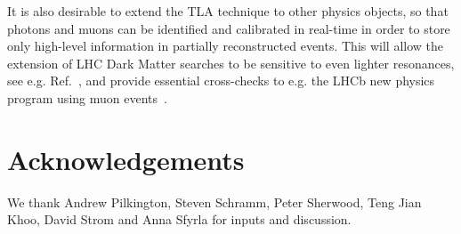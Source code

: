 \documentclass[a4paper,justified]{tufte-handout}
\begin{document}
 It is also desirable to extend the TLA technique to other physics objects, so that photons and muons can be identified and calibrated in real-time in order to store only high-level information in partially reconstructed events. This will allow the extension of LHC Dark Matter searches to be sensitive to even lighter resonances, see e.g. Ref.~\cite{Mariotti:2017vtv}, and provide essential cross-checks to e.g. the LHCb new physics program using muon events~\cite{Ilten:2016tkc}.
 
 \section*{Acknowledgements}
 
 We thank Andrew Pilkington, Steven Schramm, Peter Sherwood, Teng Jian Khoo, David Strom and Anna Sfyrla for inputs and discussion.



\clearpage



\end{document}
